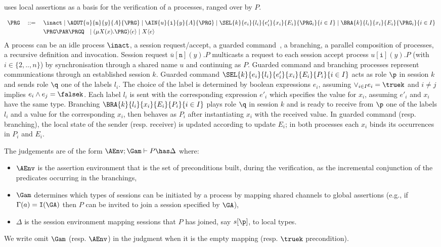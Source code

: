 \cite{BDY12} uses local assertions as a basis for the verification of a processes, ranged over by $P$. 
\newcommand{\ptp}[1]{\mathtt{#1}}

\[\begin{array}{lllll}
   \PRG &\;::=\;&
     \inact
     \mid 
\AOUT{u}{\ptp{n}}{y}{A}{\PRG}
  \mid
\AIN{u}{\ptp{i}}{y}{A}{\PRG}
\mid
\SEL{k}{e_i}{l_i}{e'_i}{x_i}{E_i}{\PRG_i}{i\in I}
\mid
\BRA{k}{l_i}{x_i}{E_i}{\PRG_i}{i \in I}  
\\[1mm]
&&  \PRG \PAR \PRGQ ~~
\mid
(\mu X(x).\PRG) \langle{e}\rangle
\mid
X\langle{e}\rangle
   \end{array}\]
A process can be an idle process $\inact$, a session request/accept, 
a guarded command~\cite{Dijkstra:1975:GCN:360933.360975}, a branching, a parallel composition of processes, a recursive definition and invocation. 
Session request $\overline{u}[\ptp{n}](y).P$ multicasts a 
request to each session accept process ${u}[\ptp{i}](y).P$ (with $i\in \{2,..,n\}$) by synchronisation through a shared name $u$ and continuing as $P$. Guarded command and branching processes represent communications through an established session $k$.
Guarded command $\SEL{k}{e_i}{l_i}{e'_i}{x_i}{E_i}{P_i}{i\in I}$ acts as role $\p$ in session $k$ and sends role $\q$ 
one of the labels $l_i$. The choice of the label is determined by boolean expressions $e_i$, assuming $\lor_{i\in I}e_i=\truek$ and $i\not= j$ implies $e_i\land e_j=\falsek$.  Each label $l_i$ is sent with the corresponding expression $e'_i$ which specifies the value for $x_i$, assuming $e'_i$ and $x_i$ have the same type. Branching $\BRA{k}{l_i}{x_i}{E_i}{P_i}{i\in I}$ plays role $\q$ in session $k$ and is ready to receive from $\p$ one of the labels $l_i$ and a value for the corresponding $x_i$, then behaves as $P_i$ after instantiating $x_i$ with the received value. In guarded command (resp. branching), the local state of the sender (resp. receiver) is updated according to update $E_i$; in both processes each $x_i$ binds its occurrences in $P_i$ and $E_i$. 


The judgements are of the form $\AEnv ; \Gam \vdash P \has  \Delta$ where: 
\begin{itemize}
\item $\AEnv$ is the assertion environment that is the set of preconditions built, during the verification, as the 
incremental conjunction of the predicates occurring in the branchings, 
\item $\Gam$ determines which types of sessions can be initiated by a process by mapping shared channels to 
global assertions (e.g.,  if $\Gamma(a)=\mathtt{I}(\GA)$ then $P$ can be invited to join a session specified by $\GA$), 
\item $\Delta$ is the session environment mapping sessions that $P$ has joined, say $s[\p]$, to local types. 
\end{itemize}
We write omit $\Gam$ (resp. $\AEnv$) in the judgment when it is the empty mapping (resp. $\truek$ precondition). 

